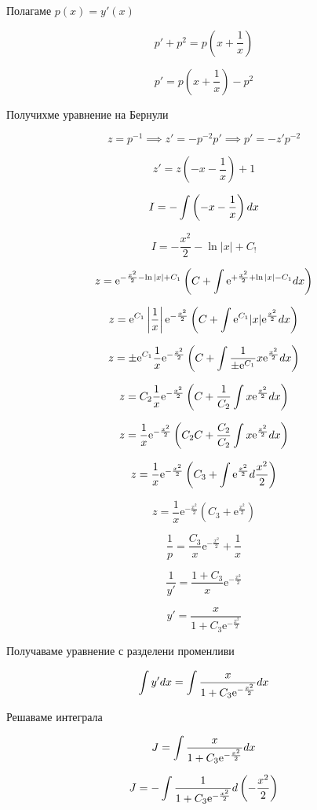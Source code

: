 \documentclass{scrartcl}
\begin{document}
Полагаме $p(x) = y'(x)$

$$p' + p^2 = p\left(x+\dfrac{1}{x}\right)$$

$$p' = p\left(x+\dfrac{1}{x}\right) - p^2$$

Получихме уравнение на Бернули

$$z = p^{-1} \implies z' = -p^{-2}p' \implies p' = -z'p^{-2}$$

$$z' = z\left(-x-\dfrac{1}{x}\right) + 1$$

$$I = - \int \left(-x-\dfrac{1}{x}\right)\space dx$$

$$I = -\dfrac{x^2}{2}-\ln{|x|} + C_!$$

$$z = \mathrm{e}^{-\frac{x^2}{2}-\ln{|x|}+C_1}\left(C+\int \mathrm{e}^{+\frac{x^2}{2}+\ln{|x|}-C_1}\space dx\right)$$

$$z = \mathrm{e}^{C_1}\left|\dfrac{1}{x}\right|\mathrm{e}^{-\frac{x^2}{2}}\left(C+\int \mathrm{e}^{C_1}|x|\mathrm{e}^{\frac{x^2}{2}}\space dx\right)$$

$$z = \pm\mathrm{e}^{C_1}\dfrac{1}{x}\mathrm{e}^{-\frac{x^2}{2}}\left(C+\int \dfrac{1}{\pm\mathrm{e}^{C_1}}x\mathrm{e}^{\frac{x^2}{2}}\space dx\right)$$

$$z = C_2\dfrac{1}{x}\mathrm{e}^{-\frac{x^2}{2}}\left(C+\dfrac{1}{C_2}\int x\mathrm{e}^{\frac{x^2}{2}}\space dx\right)$$

$$z = \dfrac{1}{x}\mathrm{e}^{-\frac{x^2}{2}}\left(C_2C+\dfrac{C_2}{C_2}\int x\mathrm{e}^{\frac{x^2}{2}}\space dx\right)$$

$$z = \dfrac{1}{x}\mathrm{e}^{-\frac{x^2}{2}}\left(C_3+\int \mathrm{e}^{\frac{x^2}{2}}\space d\frac{x^2}{2}\right)$$

$$z = \dfrac{1}{x}\mathrm{e}^{-\frac{x^2}{2}}\left(C_3+ \mathrm{e}^{\frac{x^2}{2}}\right)$$

$$\dfrac{1}{p} = \dfrac{C_3}{x}\mathrm{e}^{-\frac{x^2}{2}}+ \dfrac{1}{x}$$

$$\dfrac{1}{y'} = \dfrac{1+C_3}{x}\mathrm{e}^{-\frac{x^2}{2}}$$

$$y' = \dfrac{x}{1+C_3\mathrm{e}^{-\frac{x^2}{2}}}$$

Получаваме уравнение с разделени променливи

$$\displaystyle \int y' \space dx = \int\dfrac{x}{1+C_3\mathrm{e}^{-\frac{x^2}{2}}}\space dx$$

Решаваме интеграла

$$J = \int\dfrac{x}{1+C_3\mathrm{e}^{-\frac{x^2}{2}}}\space dx$$

$$J = -\int\dfrac{1}{1+C_3\mathrm{e}^{-\frac{x^2}{2}}}\space d\left(-\frac{x^2}{2}\right)$$
\end{document}
